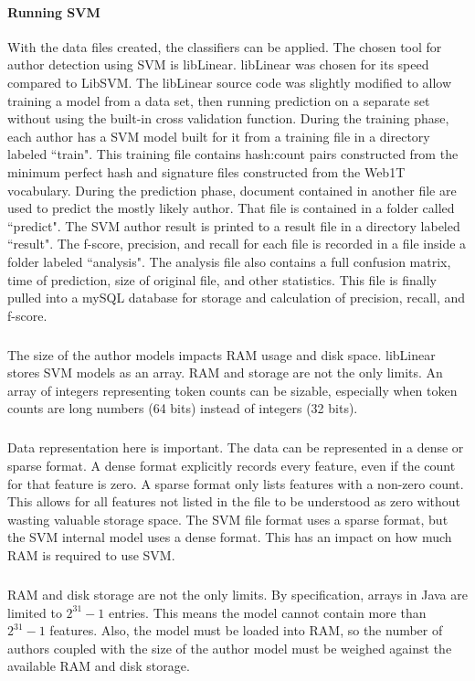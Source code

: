 	\paragraph{Running SVM} With the data files created, the classifiers can be applied. The chosen tool for author detection using SVM is libLinear.  libLinear was chosen for its speed compared to LibSVM.  The libLinear source code was slightly modified to allow training a model from a data set, then running prediction on a separate set without using the built-in cross validation function.  During the training phase, each author has a SVM model built for it from a training file in a directory labeled ``train".  This training file contains hash:count pairs constructed from the minimum perfect hash and signature files constructed from the Web1T vocabulary. During the prediction phase, document contained in another file are used to predict the mostly likely author.  That file is contained in a folder called ``predict". The SVM author result is printed to a result file in a directory labeled ``result".  The f-score, precision, and recall for each file is recorded in a file inside a folder labeled ``analysis".  The analysis file also contains a full confusion matrix, time of prediction, size of original file, and other statistics.  This file is finally pulled into a mySQL database for storage and calculation of precision, recall, and f-score.
	\subparagraph{} The size of the author models impacts RAM usage and disk space.  libLinear stores SVM models as an array. RAM and storage are not the only limits.  An array of integers representing token counts can be sizable, especially when token counts are long numbers (64 bits) instead of integers (32 bits). 
	\subparagraph{} Data representation here is important.  The data can be represented in a dense or sparse format.  A dense format explicitly records every feature, even if the count for that feature is zero.  A sparse format only lists features with a non-zero count.  This allows for all features not listed in the file to be understood as zero without wasting valuable storage space.  The SVM file format uses a sparse format, but the SVM internal model uses a dense format.  This has an impact on how much RAM is required to use SVM.  
	\subparagraph{} RAM and disk storage are not the only limits. By specification, arrays in Java are limited to $2^{31}-1$ entries.  This means the model cannot contain more than $2^{31}-1$ features.  Also, the model must be loaded into RAM, so the number of authors coupled with the size of the author model must be weighed against the available RAM and disk storage.
	
